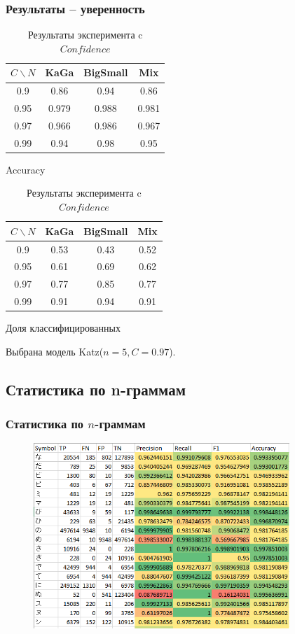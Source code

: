 \documentclass[aspectratio=169, pdf, 9pt, utf8]{beamer}
\newcommand{\KG}{\textbf{KaGa}}
\newcommand{\BS}{\textbf{BigSmall}}
\newcommand{\MX}{\textbf{Mix}}
\begin{document}
\begin{frame}
	\frametitle{Результаты -- уверенность}
	
	\begin{table}[H]
		\begin{center}
			
			\begin{multicols}{2}
				\begin{tabular}{|c|c|c|c|}\hline
					$C \backslash N$ & \KG & \BS & \MX \\ \hline
					0.9 & 0.86 & 0.94 & 0.86 \\
					0.95 & 0.979 & 0.988 & 0.981 \\
					0.97 & 0.966  & 0.986 & 0.967  \\
					0.99 & 0.94 & 0.98 & 0.95 \\ \hline 	
				\end{tabular}
				\caption*{Accuracy}
				
				\begin{tabular}{|c|c|c|c|}\hline
					$C \backslash N$ & \KG & \BS & \MX \\ \hline
					0.9 & 0.53 & 0.43 & 0.52 \\
					0.95 & 0.61 & 0.69 & 0.62 \\
					0.97 & 0.77 & 0.85  & 0.77  \\
					0.99 & 0.91 & 0.94 & 0.91 \\ \hline 	
				\end{tabular}
				\caption*{Доля классифицированных}
			\end{multicols}		
			\caption{Результаты эксперимента c $Confidence$}
			\label{table:exp1}
		\end{center}
	\end{table}

Выбрана модель Katz($n=5, C=0.97$).
\end{frame}

\subsection{ Статистика по n-граммам }
\begin{frame}
	\frametitle{Статистика по $n$-граммам}
	
		\begin{center}
		\begin{figure}[H]
			\includegraphics[height=7cm]{p_stats.png}
		\end{figure}
	\end{center}
	
\end{frame}
\end{document}
